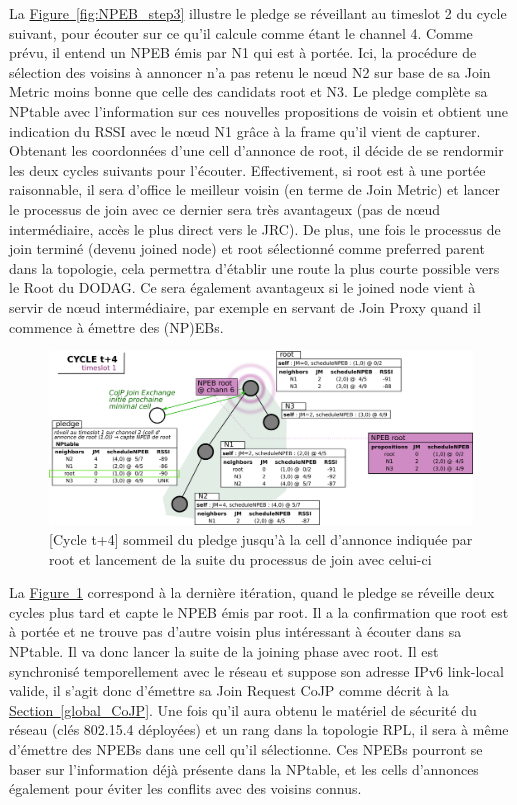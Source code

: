 \documentclass[]{report}
\newcommand{\wordlink}[2]{\hyperref[#2]{#1~\ref{#2}}}
\begin{document}
La \wordlink{Figure}{fig:NPEB_step3} illustre le pledge se réveillant au timeslot 2 du cycle suivant, pour écouter sur ce qu'il calcule comme étant le channel 4. Comme prévu, il entend un NPEB émis par N1 qui est à portée. Ici, la procédure de sélection des voisins à annoncer n'a pas retenu le nœud N2 sur base de sa Join Metric moins bonne que celle des candidats root et N3. Le pledge complète sa NPtable avec l'information sur ces nouvelles propositions de voisin et obtient une indication du RSSI avec le nœud N1 grâce à la frame qu'il vient de capturer. Obtenant les coordonnées d'une cell d'annonce de root, il décide de se rendormir les deux cycles suivants pour l'écouter. Effectivement, si root est à une portée raisonnable, il sera d'office le meilleur voisin (en terme de Join Metric) et lancer le processus de join avec ce dernier sera très avantageux (pas de nœud intermédiaire, accès le plus direct vers le JRC). De plus, une fois le processus de join terminé (devenu joined node) et root sélectionné comme preferred parent dans la topologie, cela permettra d'établir une route la plus courte possible vers le Root du DODAG. Ce sera également avantageux si le joined node vient à servir de nœud intermédiaire, par exemple en servant de Join Proxy quand il commence à émettre des (NP)EBs.

\newpage

 \vspace{0.4cm}
	\begin{figure}[!h]
	\centering
	\includegraphics[width=\linewidth]{NPEB_step4}
	\caption{[Cycle t+4] sommeil du pledge jusqu'à la cell d'annonce indiquée par root et lancement de la suite du processus de join avec celui-ci}
	\label{fig:NPEB_step4}
	\end{figure}
\vspace{0.4cm}

La \wordlink{Figure}{fig:NPEB_step4} correspond à la dernière itération, quand le pledge se réveille deux cycles plus tard et capte le NPEB émis par root. Il a la confirmation que root est à portée et ne trouve pas d'autre voisin plus intéressant à écouter dans sa NPtable. Il va donc lancer la suite de la joining phase avec root. Il est synchronisé temporellement avec le réseau et suppose son adresse IPv6 link-local valide, il s'agit donc d'émettre sa Join Request CoJP comme décrit à la \wordlink{Section}{global_CoJP}. Une fois qu'il aura obtenu le matériel de sécurité du réseau (clés 802.15.4 déployées) et un rang dans la topologie RPL, il sera à même d'émettre des NPEBs dans une cell qu'il sélectionne. Ces NPEBs pourront se baser sur l'information déjà présente dans la NPtable, et les cells d'annonces également pour éviter les conflits avec des voisins connus.\\
\end{document}
